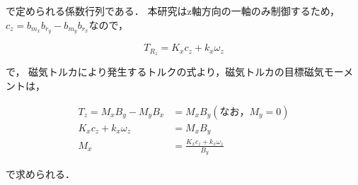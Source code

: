 で定められる係数行列である．
本研究はz軸方向の一軸のみ制御するため，$c_z = b_{m_x}b_{r_y} - b_{m_y}b_{r_x}$なので，

\begin{equation}
    T_{R_z} = K_x c_z + k_x \omega_z 
\end{equation}

で，
磁気トルカにより発生するトルクの式より，磁気トルカの目標磁気モーメントは，

\begin{equation}
    \begin{aligned}
        T_z = M_x B_y - M_y B_x &= M_x B_y (なお，M_y = 0)\\
         K_x c_z + k_x \omega_z &= M_x B_y\\
                            M_x &= \frac{K_x c_z + k_x \omega_z}{B_y}
    \end{aligned}
\end{equation}

で求められる．
